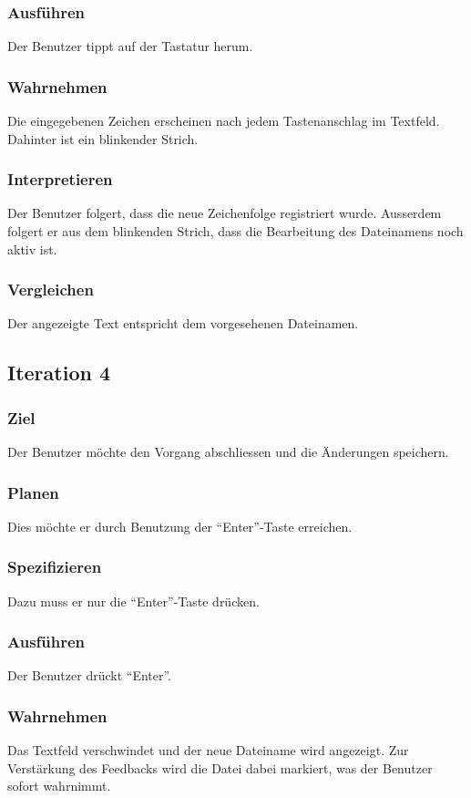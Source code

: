\subsubsection*{Ausführen}
Der Benutzer tippt auf der Tastatur herum.
\subsubsection*{Wahrnehmen}
Die eingegebenen Zeichen erscheinen nach jedem Tastenanschlag im Textfeld. Dahinter ist ein blinkender Strich.
\subsubsection*{Interpretieren}
Der Benutzer folgert, dass die neue Zeichenfolge registriert wurde. Ausserdem folgert er aus dem blinkenden Strich, dass die Bearbeitung des Dateinamens noch aktiv ist.
\subsubsection*{Vergleichen}
Der angezeigte Text entspricht dem vorgesehenen Dateinamen.

\subsection*{Iteration 4}
\subsubsection*{Ziel}
Der Benutzer möchte den Vorgang abschliessen und die Änderungen speichern.
\subsubsection*{Planen}
Dies möchte er durch Benutzung der \enquote{Enter}-Taste erreichen.
\subsubsection*{Spezifizieren}
Dazu muss er nur die \enquote{Enter}-Taste drücken.
\subsubsection*{Ausführen}
Der Benutzer drückt \enquote{Enter}.
\subsubsection*{Wahrnehmen}
Das Textfeld verschwindet und der neue Dateiname wird angezeigt. Zur Verstärkung des Feedbacks wird die Datei dabei markiert, was der Benutzer sofort wahrnimmt.
